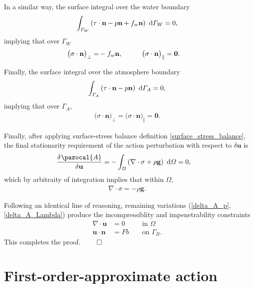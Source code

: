 In a similar way, the surface integral over the water boundary
\begin{align*}
  \int_{\varGamma_W} \left( \tau \cdot \mathbf{n} - p \mathbf{n} + f_w \mathbf{n} \right) \ \mathrm{d}\varGamma_W = 0,
\end{align*}
implying that over $\Gamma_W$
\begin{align*}
  \big( \sigma \cdot \mathbf{n} \big)_{\perp} = 
  & - f_w \mathbf{n}, \hspace{10mm} \big( \sigma \cdot \mathbf{n} \big)_{\Vert} = \mathbf{0}.
\end{align*}

Finally, the surface integral over the atmosphere boundary
\begin{align*}
  \int_{\varGamma_A} \left( \tau \cdot \mathbf{n} - p \mathbf{n} \right) \ \mathrm{d}\varGamma_A = 0,
\end{align*}
implying that over $\Gamma_A$,
\begin{align*}
  \big( \sigma \cdot \mathbf{n} \big)_{\perp} = \big( \sigma \cdot \mathbf{n} \big)_{\Vert} = \mathbf{0}.
\end{align*}

Finally, after applying surface-stress balance definition \cref{surface_stress_balance}, the final stationarity requirement of the action perturbation with respect to $\delta \mathbf{u}$ is
\begin{align*}
  \delder{\pazocal{A}}{\mathbf{u}} = 
  &- \int_{\Omega} \left( \nabla \cdot \sigma + \rho \mathbf{g} \right) \d{\Omega} = 0,
\end{align*}
which by arbitraity of integration implies that within $\Omega$,
\begin{align*}
  \nabla \cdot \sigma = -\rho \mathbf{g}.
\end{align*}

Following an identical line of reasoning, remaining variations (\cref{delta_A_p}, \cref{delta_A_Lambda}) produce the incompressiblity and impenetrability constraints
\begin{align*}
  \nabla \cdot \mathbf{u} &= 0 && \text{ in } \Omega \\
  \mathbf{u} \cdot \mathbf{n} &= Fb && \text{ on } \Gamma_B.
\end{align*}
This completes the proof. $\qed$

\section{First-order-approximate action}

